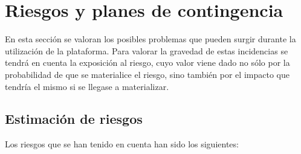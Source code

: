 \section{Riesgos y planes de contingencia}
En esta sección se valoran los posibles problemas que pueden surgir durante la utilización de la plataforma. Para valorar la gravedad de estas incidencias se tendrá en cuenta la exposición al riesgo, cuyo valor viene dado no sólo por la probabilidad de que se materialice el riesgo, sino también por el impacto que tendría el mismo si se llegase a materializar.

\subsection{Estimación de riesgos}
Los riesgos que se han tenido en cuenta han sido los siguientes:
